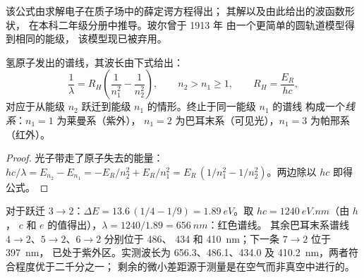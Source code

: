\begin{remark}[公式的来源]\label{rem:b1:quantum-numbers:schrodinger}
该公式由求解电子在质子场中的薛定谔方程得出；
其解以及由此给出的波函数形状，
在本科二年级分册中推导。玻尔曾于 1913 年
由一个更简单的圆轨道模型得到相同的能级，
该模型现已被弃用。
\end{remark}

\begin{proposition}[里德伯公式]\label{prop:b1:quantum-numbers:rydberg}
氢原子发出的谱线，其波长由下式给出：
\[
  \frac{1}{\lambda} = R_H\left(\frac{1}{n_1^2} - \frac{1}{n_2^2}\right),
  \qquad n_2 > n_1 \ge 1, \qquad R_H = \frac{E_R}{hc},
\]
对应于从能级 $n_2$ 跃迁到能级 $n_1$ 的情形。终止于同一能级 $n_1$ 的谱线
构成一个\emph{线系}：$n_1 = 1$ 为莱曼系（紫外），
$n_1 = 2$ 为巴耳末系（可见光），$n_1 = 3$ 为帕邢系
（红外）。
\end{proposition}

\begin{proof}
光子带走了原子失去的能量：
$hc/\lambda = E_{n_2} - E_{n_1} = -E_R/n_2^2 + E_R/n_1^2
= E_R\,(1/n_1^2 - 1/n_2^2)$。两边除以 $hc$ 即得公式。
\end{proof}

\begin{example}[氢的红色谱线]\label{ex:b1:quantum-numbers:halpha}
对于跃迁 $3 \to 2$：$\Delta E = 13.6\,(1/4 - 1/9) =
\qty{1.89}{eV}$。取 $hc = \qty{1240}{eV.nm}$（由 $h$，
$c$ 和 $e$ 的值得出），$\lambda = 1240/1.89 = \qty{656}{nm}$：红色谱线。
其余巴耳末系谱线 $4 \to 2$、$5 \to 2$、$6 \to 2$ 分别位于 486、
434 和 \qty{410}{nm}；下一条 $7 \to 2$ 位于 \qty{397}{nm}，
已处于紫外区。实测波长为 656.3、486.1、434.0
及 \qty{410.2}{nm}，两者符合程度优于二千分之一；
剩余的微小差距源于测量是在空气而非真空中进行的。
\end{example}

